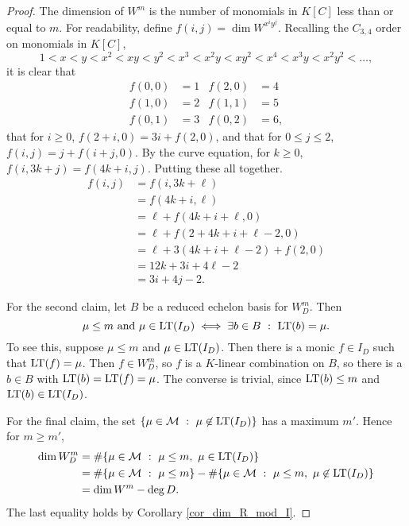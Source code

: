 \begin{proof}
  The dimension of $W^m$ is the number of monomials in $K[C]$ less than or equal to $m$.
  For readability, define $f(i,j) = \dim W^{x^iy^j}$.
  Recalling the $C_{3,4}$ order on monomials in $K[C]$,
    \[ 1 < x < y < x^2 < xy < y^2 < x^3 < x^2y < xy^2 < x^4 < x^3y < x^2y^2 < \dots, \]
  it is clear that
  \begin{align*}
    f(0,0) &= 1 & f(2,0) &= 4 \\
    f(1,0) &= 2 & f(1,1) &= 5 \\
    f(0,1) &= 3 & f(0,2) &= 6,
  \end{align*}
  that for $i \geq 0$, $f(2 + i,0) = 3i + f(2, 0)$, and that for $0 \leq j \leq 2$, $f(i,j) = j + f(i+j,0)$.
  By the curve equation, for $k \geq 0$, $f(i, 3k + j) = f(4k + i, j)$.
  Putting these all together.
  \begin{align*}
    f(i,j)
      &= f(i, 3k + \ell) \\
      &= f(4k + i, \ell) \\
      &= \ell + f(4k + i + \ell, 0) \\
      &= \ell + f(2 + 4k + i + \ell - 2, 0) \\
      &= \ell + 3(4k + i + \ell - 2) + f(2, 0) \\
      &= 12k + 3i + 4\ell - 2 \\
      &= 3i + 4j - 2.
  \end{align*}
  
  For the second claim, let $B$ be a reduced echelon basis for $W_D^m$. Then
  \[ \mu \leq m \text{ and } \mu \in \operatorname{LT}(I_D) \iff \exists b \in B ~:~ \operatorname{LT}(b) = \mu. \]
  To see this, suppose $\mu \leq m$ and $\mu \in \operatorname{LT}(I_D)$.
  Then there is a monic $f \in I_D$ such that $\operatorname{LT}(f) = \mu$.
  Then $f \in W_D^m$, so $f$ is a $K$-linear combination on $B$,
  so there is a $b \in B$ with $\operatorname{LT}(b) = \operatorname{LT}(f) = \mu$.
  The converse is trivial, since $\operatorname{LT}(b) \leq m$ and $\operatorname{LT}(b) \in \operatorname{LT}(I_D)$.
  
  For the final claim, the set $\{ \mu \in \mathcal{M} ~:~ \mu \not\in \operatorname{LT}(I_D) \}$ has a maximum $m'$.
  Hence for $m \geq m'$,
  \begin{align*}
    \dim W_D^m
      &= \# \{ \mu \in \mathcal{M} ~:~ \mu \leq m, ~\mu \in \operatorname{LT}(I_D) \} \\
      &= \# \{ \mu \in \mathcal{M} ~:~ \mu \leq m \} - \# \{ \mu \in \mathcal{M} ~:~ \mu \leq m, ~\mu \not\in \operatorname{LT}(I_D) \} \\
      &= \dim W^m - \deg D.
  \end{align*}
  The last equality holds by Corollary \ref{cor_dim_R_mod_I}.
\end{proof}



